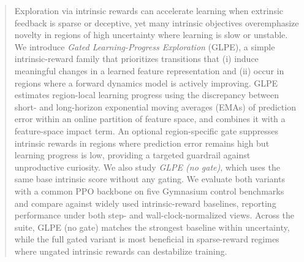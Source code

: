 \begin{abstract}
Exploration via intrinsic rewards can accelerate learning when extrinsic feedback is sparse or deceptive, yet many intrinsic objectives overemphasize novelty in regions of high uncertainty where learning is slow or unstable.
We introduce \emph{Gated Learning-Progress Exploration} (GLPE), a simple intrinsic-reward family that prioritizes transitions that (i) induce meaningful changes in a learned feature representation and (ii) occur in regions where a forward dynamics model is actively improving.
GLPE estimates region-local learning progress using the discrepancy between short- and long-horizon exponential moving averages (EMAs) of prediction error within an online partition of feature space, and combines it with a feature-space impact term.
An optional region-specific gate suppresses intrinsic rewards in regions where prediction error remains high but learning progress is low, providing a targeted guardrail against unproductive curiosity.
We also study \emph{GLPE (no gate)}, which uses the same base intrinsic score without any gating.
We evaluate both variants with a common PPO backbone on five Gymnasium control benchmarks and compare against widely used intrinsic-reward baselines, reporting performance under both step- and wall-clock-normalized views.
Across the suite, GLPE (no gate) matches the strongest baseline within uncertainty, while the full gated variant is most beneficial in sparse-reward regimes where ungated intrinsic rewards can destabilize training.
\end{abstract}
